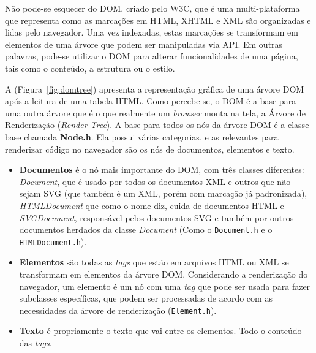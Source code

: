 \begin{figure}[th]
\end{figure}

Não pode-se esquecer do DOM, criado pelo W3C, que é uma multi-plataforma que representa como as marcações em HTML, XHTML e XML são organizadas e lidas pelo navegador. Uma vez indexadas, estas marcações se transformam em elementos de uma árvore que podem ser manipuladas via API. Em outras palavras, pode-se utilizar o DOM para alterar funcionalidades de uma página, tais como o conteúdo, a estrutura ou o estilo.

A (Figura~\ref{fig:domtree}) apresenta a representação gráfica de uma árvore DOM após a leitura de uma tabela HTML. Como percebe-se, o DOM é a base para uma outra árvore que é o que realmente um \textit{browser} monta na tela, a Árvore de Renderização (\textit{Render Tree}). A base para todos os nós da árvore DOM é a classe base chamada \textbf{Node.h}. Ela possui várias categorias, e as relevantes para renderizar código no navegador são os nós de documentos, elementos e texto.
\begin{itemize}
    \item \textbf{Documentos} é o nó mais importante do DOM, com três classes diferentes: \textit{Document}, que é usado por todos os documentos XML e outros que não sejam SVG (que também é um XML, porém com marcação já padronizada), \textit{HTMLDocument} que como o nome diz, cuida de documentos HTML e \textit{SVGDocument}, responsável pelos documentos SVG e também por outros documentos herdados da classe \textit{Document} (Como o \texttt{Document.h} e o \texttt{HTMLDocument.h}).
    \item \textbf{Elementos} são todas as \textit{tags} que estão em arquivos HTML ou XML se transformam em elementos da árvore DOM. Considerando a renderização do navegador, um elemento é um nó com uma \textit{tag} que pode ser usada para fazer subclasses específicas, que podem ser processadas de acordo com as necessidades da árvore de renderização (\texttt{Element.h}).
    \item \textbf{Texto} é propriamente o texto que vai entre os elementos. Todo o conteúdo das \textit{tags}.
\end{itemize}
%
%
%
%
%
%
%
%
%
